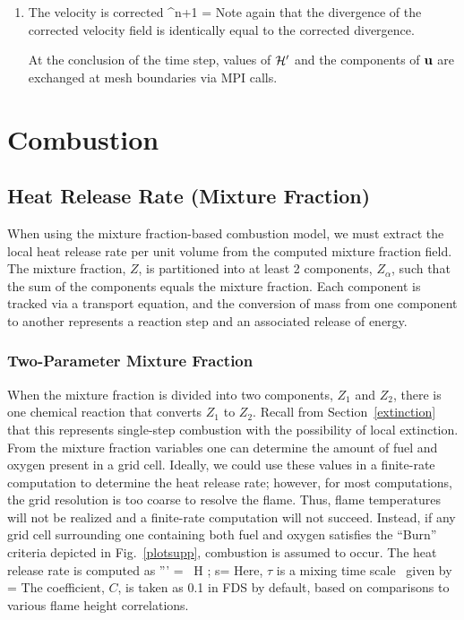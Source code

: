 \documentclass[11pt]{book}
\begin{document}
\begin{enumerate}
\item The velocity is corrected
\be
\bu^{n+1} = \ha {}
\ee
Note again that the divergence of the corrected velocity field is identically equal to the corrected divergence.

At the conclusion of the time step, values of $\cal H'$ and the components of ${\bf u}$ are exchanged at mesh boundaries via MPI calls.

\end{enumerate}



\clearpage
\section{Combustion}

\subsection{Heat Release Rate (Mixture Fraction)}


When using the mixture fraction-based combustion model, we must extract the local heat release rate per unit
volume from the computed mixture
fraction field. The mixture fraction, $Z$, is partitioned into at least 2 components, $Z_\alpha$, such that the
sum of the components equals the mixture
fraction. Each component is tracked via a transport equation, and the conversion of mass from one
component to another represents a reaction step and an associated release of energy.


\subsubsection{Two-Parameter Mixture Fraction}

When the mixture fraction is divided into two components, $Z_1$ and $Z_2$, there is one chemical
reaction that converts $Z_1$ to $Z_2$.  Recall from Section~\ref{extinction}
that this represents single-step combustion with the possibility of local extinction.  From the mixture fraction
variables one can determine the amount of fuel and oxygen present in a grid cell.  Ideally, we could use these values
in a finite-rate computation to determine the heat release rate; however, for most computations, the
grid resolution is too coarse to resolve the flame.  Thus, flame temperatures will not be realized and a
finite-rate computation will not succeed.
Instead, if any grid cell surrounding one containing both fuel and oxygen satisfies the ``Burn'' criteria depicted in Fig.~\ref{plotsupp},
combustion is assumed to occur.  The heat release rate is computed as
\be \dq''' =  \, \Delta H  \quad ; \quad s=   \ee
Here, $\tau$ is a mixing time scale~\cite{Raman:CF} given by
\be \tau =   \ee
The coefficient, $C$, is taken as 0.1 in FDS by default, based on comparisons to various flame height correlations.
\end{document}
